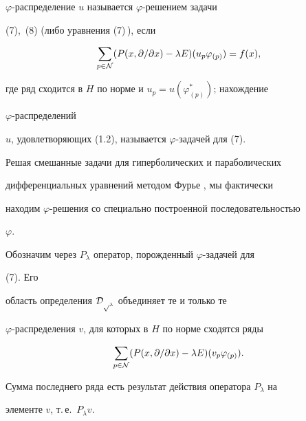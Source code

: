 \begin{defns} 


$\varphi$-распределение $u$ называется $\varphi$-решением задачи 


(7),~(8) (либо уравнения (7)\,), если 


\begin{equation} 


\sum_{p\in\cal N}(P(x,\partial/\partial x)-\lambda E) 


(u_p\varphi_{(p)})=f(x), 


\end{equation} 


где ряд сходится в $H$ по норме и $u_p=u(\varphi^*_{(p)})$; нахождение 


$\varphi$-распределений 


$u$, удовлетворяющих (1.2), называется $\varphi$-задачей для (7). 


\end{defns} 


 


\begin{notes} 


Решая смешанные задачи для гиперболических и параболических 


дифференциальных уравнений методом Фурье \cite{7}, мы фактически 


находим $\varphi$-решения со специально построенной последовательностью 


$\varphi$. 


\end{notes} 


 


Обозначим через $P_\lambda$ оператор, порожденный $\varphi$-задачей для 


(7). Его 


область определения $\cal D_{p_\lambda}$ объединяет те и только те 


$\varphi$-распределения $v$, для которых в $H$ по норме сходятся ряды 


$$ 


\sum_{p\in\cal N}(P(x,\partial/\partial x)-\lambda E) 


(v_p\varphi_{(p)}). 


$$ 


Сумма последнего ряда есть результат действия оператора $P_\lambda$ на 


элементе $v$, т.\,е.~$P_\lambda v$. 


